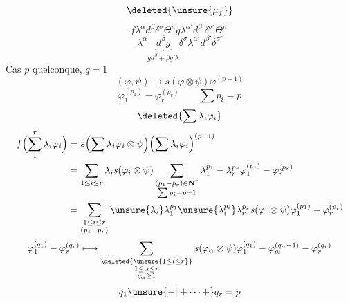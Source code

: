 \[
\deleted{\unsure{\mu_f}}
\]
\[
f\lambda^\alpha d^\beta\delta^\sigma\Theta^n
g\lambda^{\alpha'}d^{\beta'}\delta^{\sigma'}\Theta^{n'}
\]
\[
\lambda^\alpha\underbrace{d^\beta g}_{g d^\beta+\beta g'\lambda}
\delta^\sigma\lambda^{\alpha'}d^{\beta'}\delta^{\sigma'}
\]
Cas $p$ quelconque, $q=1$
\[
(\varphi,\psi)\longrightarrow s(\varphi\otimes\psi)\varphi^{(p-1)}
\]
\[
\varphi_1^{(p_1)}-\varphi_r^{(p_r)}\qquad\sum p_i=p
\]
\[
\deleted{\sum\lambda_i\varphi_i}
\]
\[
\begin{aligned}
f\Bigl(\sum_i^r\lambda_i\varphi_i\Bigr)
&=s\Bigl(\sum\lambda_i\varphi_i\otimes\psi\Bigr)
\Bigl(\sum\lambda_i\varphi_i\Bigr)^{(p-1)}\\
&=\sum_{1\le i\le r}\lambda_i s(\varphi_i\otimes\psi)
\sum_{\substack{(p_1-p_r)\in\mathbf N^r\\\sum p_i=p-1}}
\lambda_1^{p_1}-\lambda_r^{p_r}\varphi_1^{(p_1)}-\varphi_r^{(p_r)}\\
&=\sum_{\substack{1\le i\le r\\(p_1-p_r)}}
\unsure{\lambda_i}\lambda_1^{p_1}\unsure{\lambda_i^{p_i}}\lambda_r^{p_r}
s(\varphi_i\otimes\psi)\varphi_1^{(p_1)}-\varphi_r^{(p_r)}
\end{aligned}
\]
\[
\varphi_1^{(q_1)}-\varphi_r^{(q_r)}\longmapsto
\sum_{\substack{\deleted{\unsure{1\le i\le r}}\\1\le\alpha\le r\\q_\alpha\ge1}}
s(\varphi_\alpha\otimes\psi)\varphi_1^{(q_1)}-
\varphi_\alpha^{(q_\alpha-1)}-\varphi_r^{(q_r)}
\]
\[
q_1\unsure{-|+\cdots+}q_r=p
\]
\diagram{\begin{tikzcd}[row sep=large]
\Gamma^2\Phi_*\otimes\Psi_*\arrow[d,bend left=35,"?"]\\
\Gamma^2\Phi_*\otimes\Phi_*\arrow[u]\\
\Gamma^2\Phi_*\arrow[u]\\
0\arrow[u]
\end{tikzcd}}
